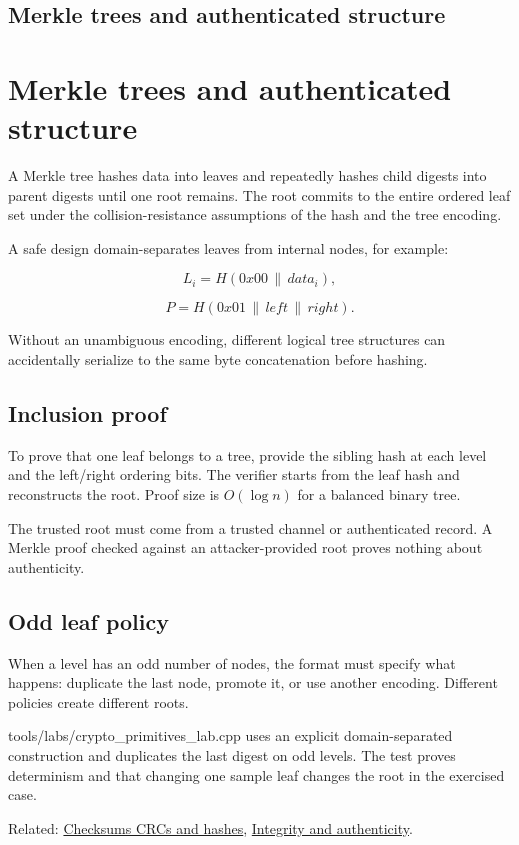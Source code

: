 \hypertarget{appendix-098192f8d46d}{}
\section*{Merkle trees and authenticated structure}
\chapter{Merkle trees and authenticated structure}\label{appendix-098192f8d46d-merkle-trees-and-authenticated-structure}

A Merkle tree hashes data into leaves and repeatedly hashes child digests into parent digests until one root remains. The root commits to the entire ordered leaf set under the collision-resistance assumptions of the hash and the tree encoding.

A safe design domain-separates leaves from internal nodes, for example:

\[
L_i=H(0x00\,\|\,data_i),
\]

\[
P=H(0x01\,\|\,left\,\|\,right).
\]

Without an unambiguous encoding, different logical tree structures can accidentally serialize to the same byte concatenation before hashing.

\section{Inclusion proof}\label{appendix-098192f8d46d-inclusion-proof}

To prove that one leaf belongs to a tree, provide the sibling hash at each level and the left/right ordering bits. The verifier starts from the leaf hash and reconstructs the root. Proof size is \(O(\log n)\) for a balanced binary tree.

The trusted root must come from a trusted channel or authenticated record. A Merkle proof checked against an attacker-provided root proves nothing about authenticity.

\section{Odd leaf policy}\label{appendix-098192f8d46d-odd-leaf-policy}

When a level has an odd number of nodes, the format must specify what happens: duplicate the last node, promote it, or use another encoding. Different policies create different roots.

tools/labs/crypto\_primitives\_lab.cpp uses an explicit domain-separated construction and duplicates the last digest on odd levels. The test proves determinism and that changing one sample leaf changes the root in the exercised case.

Related: \hyperref[appendix-ed338677de0a]{Checksums CRCs and hashes}, \hyperref[appendix-cbe594d1ab0a]{Integrity and authenticity}.
